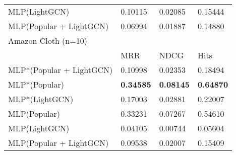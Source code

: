 \begin{tabular}{llll}
 MLP(LightGCN)            & 0.10115                                                 & 0.02085                                                 & 0.15444                                                 \\
 MLP(Popular + LightGCN)  & 0.06994 & 0.01887 & 0.14880 \\\hline
 Amazon Cloth (n=10)      &                                                         &                                                         &                                                         \\\hline
                          & MRR                                                     & NDCG                                                    & Hits                                                    \\\hline
 MLP*(Popular + LightGCN) & 0.10998                                                 & 0.02353                                                 & 0.18494                                                 \\
 MLP*(Popular)            & \textbf{0.34585}                                                 & \textbf{0.08145}                                                 & \textbf{0.64870}                                                 \\
 MLP*(LightGCN)           & 0.17003                                                 & 0.02881                                                 & 0.22007                                                 \\
 MLP(Popular)             & 0.33231                                                 & 0.07267                                                 & 0.54610                                                 \\
 MLP(LightGCN)            & 0.04105                                                 & 0.00744                                                 & 0.05604                                                 \\
 MLP(Popular + LightGCN)  & 0.09538 & 0.02007 & 0.15409 \\
\hline
\end{tabular}
